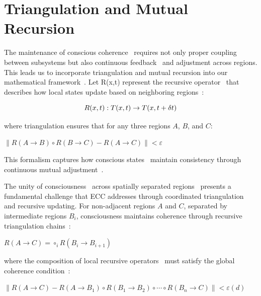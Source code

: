 \section{Triangulation and Mutual Recursion~}

The maintenance of conscious coherence~ requires not only proper coupling between subsystems but also continuous feedback~ and adjustment across regions. This leads us to incorporate triangulation and mutual recursion into our mathematical framework~. Let R(x,t) represent the recursive operator~ that describes how local states update based on neighboring regions~:

\begin{equation}
    R(x,t): T(x,t) \rightarrow T(x,t + \delta t)
    \myequation{Recursive operator for state updates in consciousness}
    \label{eq:recursive_operator}
\end{equation}

where triangulation ensures that for any three regions $A$, $B$, and $C$:

$\|R(A \rightarrow B) \circ R(B \rightarrow C) - R(A \rightarrow C)\| < \varepsilon$

This formalism captures how conscious states~ maintain consistency through continuous mutual adjustment~.

The unity of consciousness~ across spatially separated regions~ presents a fundamental challenge that ECC addresses through coordinated triangulation~ and recursive updating. For non-adjacent regions $A$ and $C$, separated by intermediate regions $B_i$, consciousness maintains coherence through recursive triangulation chains~:

$R(A \rightarrow C) = \circ_{i} R(B_i \rightarrow B_{i+1})$

where the composition of local recursive operators~ must satisfy the global coherence condition~:

$\|R(A \rightarrow C) - R(A \rightarrow B_1) \circ R(B_1 \rightarrow B_2) \circ \cdots \circ R(B_n \rightarrow C)\| < \varepsilon(d)$

